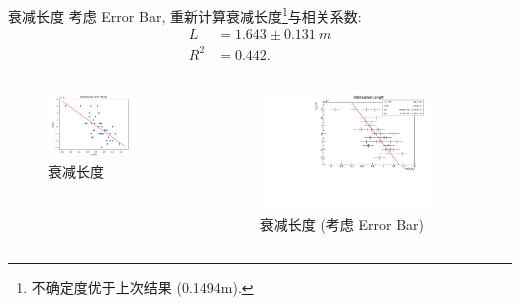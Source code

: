 \documentclass[10pt]{beamer}
\begin{document}
\begin{frame}[label={sec:org59e76f3}]{衰减长度}
考虑 Error Bar, 重新计算衰减长度\footnote{不确定度优于上次结果 (0.1494m).}与相关系数:
\begin{align}
\label{eq:3}
L &= 1.643 \pm \qty{0.131}{m} \\
R^2 &= 0.442.
\end{align}

\begin{columns}
\begin{column}{0.5\columnwidth}
\begin{figure}[htbp]
\centering
\includegraphics[width=0.8\textwidth]{../../DetectorPerform/AttenuationLength/figs/Dist.png}
\caption{衰减长度}
\end{figure}
\end{column}

\begin{column}{0.5\columnwidth}
\begin{figure}[htbp]
\centering
\includegraphics[width=0.8\textwidth]{../../DetectorPerform/AttenuationLength/figs/AttenuationLength.pdf}
\caption{衰减长度 (考虑 Error Bar)}
\end{figure}
\end{column}
\end{columns}
\end{frame}
\end{document}
